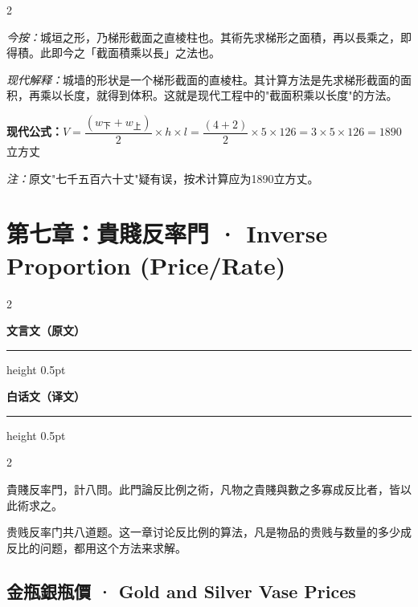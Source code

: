 \documentclass[11pt,a4paper]{article}
\newcommand{\classicalheader}{%
  \begin{center}
  \textbf{\textcolor{headerclassical}{\large 文言文（原文）}}
  \end{center}
  \vspace{-0.3em}
  \hrule height 0.5pt \color{classicalborder}
  \vspace{0.5em}
}
\newcommand{\modernheader}{%
  \begin{center}
  \textbf{\textcolor{headermodern}{\large 白话文（译文）}}
  \end{center}
  \vspace{-0.3em}
  \hrule height 0.5pt \color{modernborder}
  \vspace{0.5em}
}
\begin{document}
\begin{paracol}{2}
\begin{leftcolumn}
\textit{今按：}城垣之形，乃梯形截面之直棱柱也。其術先求梯形之面積，再以長乘之，即得積。此即今之「截面積乘以長」之法也。
\end{leftcolumn}
\begin{rightcolumn}
\textit{现代解释：}城墙的形状是一个梯形截面的直棱柱。其计算方法是先求梯形截面的面积，再乘以长度，就得到体积。这就是现代工程中的"截面积乘以长度"的方法。

\textbf{现代公式：}$V = \dfrac{(w_{\text{下}} + w_{\text{上}})}{2} \times h \times l = \dfrac{(4+2)}{2} \times 5 \times 126 = 3 \times 5 \times 126 = 1890$ 立方丈

\textit{注：}原文"七千五百六十丈"疑有误，按术计算应为1890立方丈。
\end{rightcolumn}
\end{paracol}

\newpage

\section{第七章：貴賤反率門 · Inverse Proportion (Price/Rate)}

\begin{paracol}{2}
\begin{leftcolumn}
\classicalheader
\end{leftcolumn}
\begin{rightcolumn}
\modernheader
\end{rightcolumn}
\end{paracol}

\begin{paracol}{2}
\begin{leftcolumn}
貴賤反率門，計八問。此門論反比例之術，凡物之貴賤與數之多寡成反比者，皆以此術求之。
\end{leftcolumn}
\begin{rightcolumn}
贵贱反率门共八道题。这一章讨论反比例的算法，凡是物品的贵贱与数量的多少成反比的问题，都用这个方法来求解。
\end{rightcolumn}
\end{paracol}

\vspace{0.5em}

\subsection{金瓶銀瓶價 · Gold and Silver Vase Prices}
\end{document}
